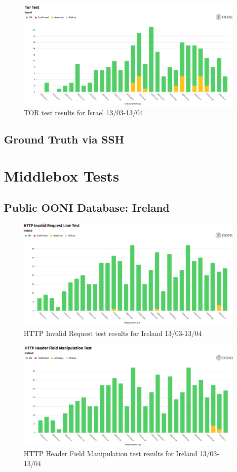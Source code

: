 \begin{figure} [H]
    \centering
    \includegraphics[width=0.5\linewidth]{ISROONITOR.png}
    \caption{TOR test results for Israel 13/03-13/04}
    \label{fig:enter-label}
\end{figure}

\subsection{Ground Truth via SSH}

\section{Middlebox Tests}
\subsection{Public OONI Database: Ireland}

\begin{figure} [H]
    \centering
    \includegraphics[width=0.5\linewidth]{IREOONIDBMB1.png}
    \caption{HTTP Invalid Request test results for Ireland 13/03-13/04}
    \label{fig:enter-label}
\end{figure}

\begin{figure} [H]
    \centering
    \includegraphics[width=0.5\linewidth]{IREOONIDBMB2.png}
    \caption{HTTP Header Field Manipulation test results for Ireland 13/03-13/04}
    \label{fig:enter-label}
\end{figure}

